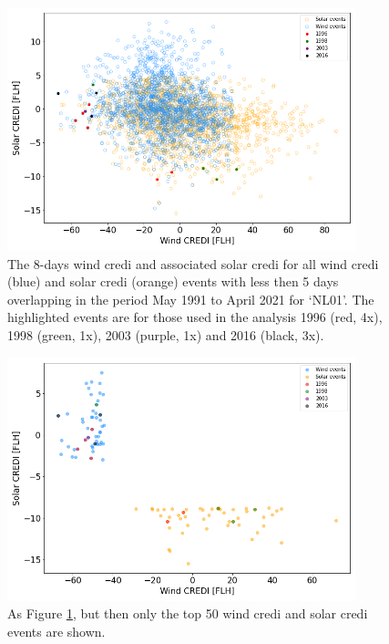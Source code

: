 \documentclass[a4paper,11pt]{extarticle}
\newcommand{\sdi}[0]{{\sc solar credi}}
\newcommand{\wdi}[0]{{\sc wind credi}}
\begin{document}
\begin{figure}[ht]
        \centering
        \includegraphics[width=0.9\textwidth]{WindCREDI_shortterm_scatter}
        \caption{
                The 8-days \wdi{} and associated \sdi{} for all \wdi{} (blue) and \sdi{} (orange) events with less then 5 days overlapping in the period May 1991 to April 2021 for `NL01'. 
                The highlighted events are for those used in the analysis 1996 (red, 4x), 1998 (green, 1x), 2003 (purple, 1x) and 2016 (black, 3x). 
        }
        \label{SIfig:analysis_short-term-winter_wind_scatter}
\end{figure}

\begin{figure}[hb]
        \centering
        \includegraphics[width=0.9\textwidth]{WindCREDI_shortterm_scatter_top50}
        \caption{
                As Figure \ref{SIfig:analysis_short-term-winter_wind_scatter}, but then only the top 50 \wdi{} and \sdi{} events are shown. 
        }
        \label{SIfig:analysis_short-term-winter_wind_scatter_top50}
\end{figure}
\end{document}
